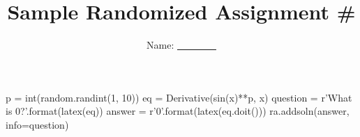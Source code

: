 \documentclass{article}
\title{Sample Randomized Assignment \#}
\author{Name: \underline{~~~~~~~~}}
\begin{document}
\maketitle

\begin{pycode}
p = int(random.randint(1, 10))
eq = Derivative(sin(x)**p, x)
question = r'What is ${0}$?'.format(latex(eq))
answer = r'${0}$'.format(latex(eq.doit()))
ra.addsoln(answer, info=question)
\end{pycode}

\end{document}
